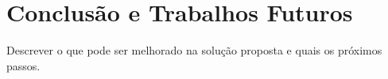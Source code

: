
\chapter{Conclusão e Trabalhos Futuros} \label{cap6}

Descrever o que pode ser melhorado na solução proposta e quais os próximos passos.
